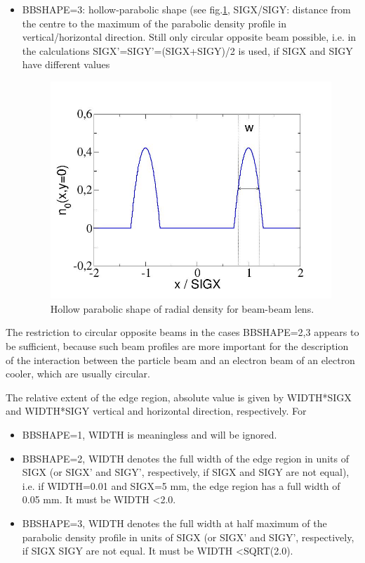 \begin{madlist}
\begin{itemize}
        \item  BBSHAPE=3: hollow-parabolic shape (see
          fig.\ref{fig:beambeam_n_hollowparabol},  
          SIGX/SIGY: distance from the centre 
          to the maximum of the parabolic density profile in vertical/horizontal 
          direction. Still only circular opposite beam possible, 
          i.e. in the calculations 
          SIGX'=SIGY'=(SIGX+SIGY)/2 is used, if SIGX and SIGY have different values 

\begin{figure}[h]
  \begin{center}
    \flushright
    \includegraphics[width=420px]{jpg/beambeam_n_hollowparabol.jpg}
    \caption{Hollow parabolic shape of radial density for beam-beam lens.} 
    \label{fig:beambeam_n_hollowparabol}
  \end{center}
\end{figure}

     \end{itemize}
     
     The restriction to circular opposite beams in the cases BBSHAPE=2,3 
     appears to be sufficient, because such beam profiles are more important 
     for the description of the interaction between the particle beam and 
     an electron beam of an electron cooler, which are usually circular. 
     
    The relative extent of the edge region, absolute value is given by 
     WIDTH*SIGX and WIDTH*SIGY vertical and horizontal direction, respectively. 
     For 
     \begin{itemize}
        \item  BBSHAPE=1, WIDTH is meaningless and will be ignored.
	\item  BBSHAPE=2, WIDTH denotes the full width of the edge region in units of 
          SIGX (or SIGX' and SIGY', respectively, if SIGX and SIGY are not equal), i.e. 
          if WIDTH=0.01 and SIGX=5 mm, the edge  region has a full width of 0.05
          mm. It must be WIDTH \textless   2.0.
	\item  BBSHAPE=3, WIDTH denotes the full width at half maximum of the parabolic 
          density profile in units of SIGX (or SIGX' and SIGY', respectively, if SIGX 
          SIGY are not equal. It must be WIDTH \textless SQRT(2.0).
     \end{itemize} 


\end{madlist}
